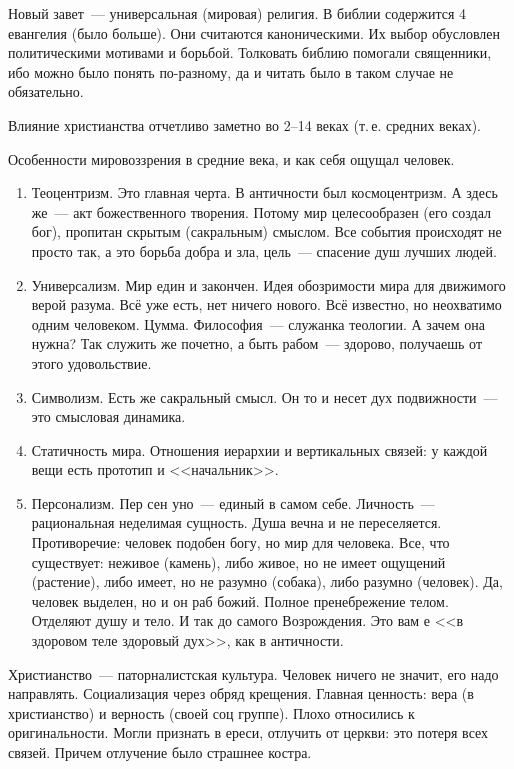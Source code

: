 Новый завет~--- универсальная (мировая) религия.
В библии содержится 4 евангелия (было больше). Они считаются каноническими. Их выбор обусловлен политическими мотивами и борьбой. Толковать библию помогали священники, ибо можно было понять по-разному, да и читать было в таком случае не обязательно.

Влияние христианства отчетливо заметно во 2--14 веках (т.\,е. средних веках). 

Особенности мировоззрения в средние века, и как себя ощущал человек.

\begin{enumerate}
	\item Теоцентризм. Это главная черта. В античности был космоцентризм. А здесь же~--- акт божественного творения. Потому мир целесообразен (его создал бог), пропитан скрытым (сакральным) смыслом. Все события происходят не просто так, а это борьба добра и зла, цель~--- спасение душ лучших людей.
	\item Универсализм. Мир един и закончен. Идея обозримости мира для движимого верой разума. Всё уже есть, нет ничего нового. Всё известно, но неохватимо одним человеком. Цумма. Философия~--- служанка теологии. А зачем она нужна? Так служить же почетно, а быть рабом~--- здорово, получаешь от этого удовольствие.
	\item Символизм. Есть же сакральный смысл. Он то и несет дух подвижности~--- это смысловая динамика.
	\item Статичность мира. Отношения иерархии и вертикальных связей: у каждой вещи есть прототип и <<начальник>>.
	\item Персонализм. Пер сен уно~--- единый в самом себе. Личность~--- рациональная неделимая сущность. Душа вечна и не переселяется. Противоречие: человек подобен богу, но мир для человека. Все, что существует: неживое (камень), либо живое, но не имеет ощущений (растение), либо имеет, но не разумно (собака), либо разумно (человек). Да, человек выделен, но и он раб божий. Полное пренебрежение телом. Отделяют душу и тело. И так до самого Возрождения. Это вам е <<в здоровом теле здоровый дух>>, как в античности.
\end{enumerate}

Христианство~--- паторналистская культура.
Человек ничего не значит, его надо направлять.
Социализация через обряд крещения.
Главная ценность: вера (в христианство) и верность (своей соц группе). 
Плохо относились к оригинальности. Могли признать в ереси, отлучить от церкви: это потеря всех связей. Причем отлучение было страшнее костра.

